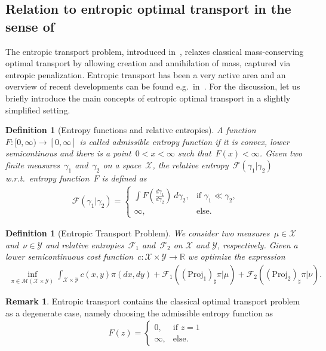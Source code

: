 \documentclass{article}
\newtheorem{definition}[theorem]{Definition}
\theoremstyle{definition}
\newtheorem{remark}[theorem]{Remark}
\begin{document}
\subsection{Relation to entropic optimal transport in the sense of~\cite{liero2018optimal}}\label{sec:entropic_optimal_transport}
The entropic transport problem, introduced in~\cite{liero2018optimal}, relaxes classical mass-conserving optimal transport by allowing creation and annihilation of mass, captured via entropic penalization. Entropic transport has been a very active area and an overview of recent developments can be found e.g.~in~\cite{TreZua23}. 
For the discussion, let us briefly introduce the main concepts of entropic optimal transport in a slightly simplified setting. 
\begin{definition}[Entropy functions and relative entropies]
    A function~$F: [0, \infty) \to [0, \infty]$ is called \emph{admissible entropy function} if it is convex, lower semicontinous and there is a point~$0 < x < \infty$ such that~$F(x)< \infty$. Given two finite measures~$\gamma_1$ and~$\gamma_2$ on a space~$\mathcal{X}$, the relative entropy~$\mathcal{F}(\gamma_1|\gamma_2)$ w.r.t.~entropy function~$F$ is defined as
    \begin{align}
        \mathcal{F}(\gamma_1|\gamma_2) = \begin{cases}
            \int F(\frac{d\gamma_1}{d \gamma_2}) \ d \gamma_2, &\mbox{if } \gamma_1 \ll \gamma_2, \\
            \infty, & \mbox{else}.
        \end{cases}
    \end{align}
\end{definition}
\begin{definition}[Entropic Transport Problem]\label{def:entropy_transport}
    We consider two measures~$\mu \in \mathcal{X}$ and~$\nu \in \mathcal{Y}$ and relative entropies~$\mathcal{F}_1$ and~$\mathcal{F}_2$ on $\mathcal{X}$ and $\mathcal{Y}$, respectively. Given a lower semicontinuous cost function~$c: \mathcal{X} \times \mathcal{Y} \to \mathbb{R}$  we optimize the expression
    \begin{align}\tag{ETP}
        \inf_{\pi \in \mathcal{M} (\mathcal{X} \times \mathcal{Y})}  \int_{\mathcal{X} \times \mathcal{Y}} c(x,y) \pi(dx, dy) + \mathcal{F}_1((\mbox{Proj}_1)_\sharp \pi|\mu) +  \mathcal{F}_2((\mbox{Proj}_2)_{\sharp} \pi|\nu) .
    \end{align}
\end{definition}
\begin{remark} Entropic transport contains the classical optimal transport problem as a degenerate case, namely choosing the admissible entropy function as 
\begin{align}\label{equ:entropy_function_classical_OT}
    F(z) = \begin{cases}
        0, & \mbox{if } z =1\\
        \infty, & \mbox{else}.
    \end{cases}
\end{align}    
\end{remark}
\end{document}

